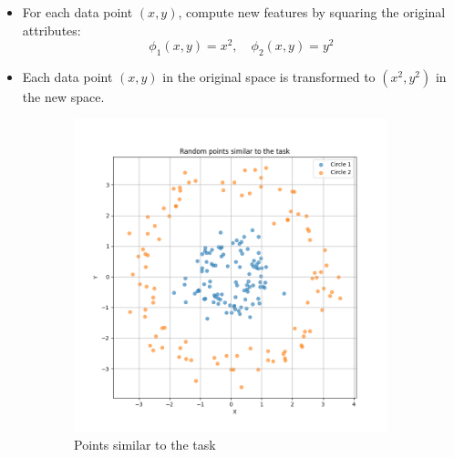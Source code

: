 \documentclass{article}
\begin{document}
\begin{itemize}
    \item For each data point \((x, y)\), compute new features by squaring the original attributes:
    \[
    \phi_1(x, y) = x^2, \quad \phi_2(x, y) = y^2
    \]

    \item Each data point \((x, y)\) in the original space is transformed to \((x^2, y^2)\) in the new space.
\end{itemize}

\begin{figure}[H]
    \centering
    \begin{subfigure}{0.45\textwidth}
        \centering
        \includegraphics[width=\textwidth]{random_points.png}
        \caption{Points similar to the task}
    \end{subfigure}
    \hfill
    \begin{subfigure}{0.45\textwidth}
        \centering

\end{subfigure}
\end{figure}
\end{document}
